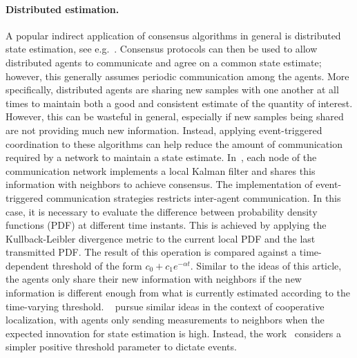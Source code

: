 \documentclass{autart}
\begin{document}
\paragraph*{Distributed estimation.} A popular indirect application of
consensus algorithms in general is distributed state estimation, see
e.g.~\citep{LZ-ZW-DZ:17}. Consensus protocols can then be used to
allow distributed agents to communicate and agree on a common state
estimate; however, this generally assumes periodic communication among
the agents. {More specifically, distributed agents are sharing
  new samples with one another at all times to maintain both a good
  and consistent estimate of the quantity of interest. However, this
  can be wasteful in general, especially if new samples being shared
  are not providing much new information.  } Instead, applying
event-triggered coordination to these algorithms can help reduce the
amount of communication required by a network to maintain a state
estimate. In~\citep{GB-LC-DS:16}, each node of the communication
network implements a local Kalman filter and shares this information
with neighbors to achieve consensus. The implementation of
event-triggered communication strategies restricts inter-agent
communication. In this case, it is necessary to evaluate the
difference between probability density functions (PDF) at different
time instants. This is achieved by applying the Kullback-Leibler
divergence metric to the current local PDF and the last transmitted
PDF. The result of this operation is compared against a time-dependent
threshold of the form $c_0+c_1e^{-\alpha t}$. {Similar to the
  ideas of this article, the agents only share their new information
  with neighbors if the new information is different enough from what
  is currently estimated according to the time-varying
  threshold. ~\cite{MO-DI-NA-SM:18} pursue similar ideas in the
  context of cooperative localization, with agents only sending
  measurements to neighbors when the expected innovation for state
  estimation is high.} Instead, the work~\citep{QL-ZW-XH-DHZ:15b}
considers a simpler positive threshold parameter to dictate events.
\end{document}
